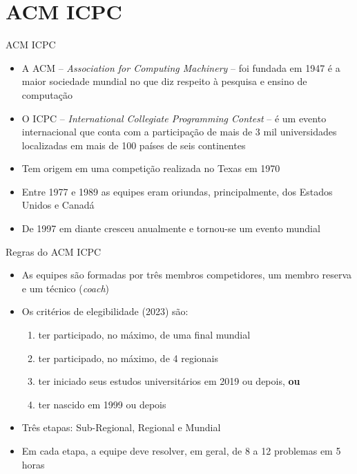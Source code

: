 \section{ACM ICPC}

\begin{frame}[fragile]{ACM ICPC}

    \begin{itemize}
        \item A ACM -- \textit{Association for Computing Machinery} -- foi fundada em 1947 é 
        a maior sociedade mundial no que diz respeito à pesquisa e ensino de computação
        \item O ICPC -- \textit{International Collegiate Programming Contest} -- é um evento
        internacional que conta com a participação de mais de 3 mil universidades localizadas em
        mais de 100 países de seis continentes
        \item Tem origem em uma competição realizada no Texas em 1970
        \item Entre 1977 e 1989 as equipes eram oriundas, principalmente, dos Estados Unidos e Canadá
        \item De 1997 em diante cresceu anualmente e tornou-se um evento mundial
    \end{itemize}

\end{frame}

\begin{frame}[fragile]{Regras do ACM ICPC}

    \begin{itemize}
        \item As equipes são formadas por três membros competidores, um membro reserva e um 
        técnico (\textit{coach})
        \item Os critérios de elegibilidade (2023) são:
            \begin{enumerate}
                \item ter participado, no máximo, de uma final mundial
                \item ter participado, no máximo, de 4 regionais
                \item ter iniciado seus estudos universitários em 2019 ou depois, \textbf{ou} 
                \item ter nascido em 1999 ou depois
            \end{enumerate}
        \item Três etapas: Sub-Regional, Regional e Mundial
        \item Em cada etapa, a equipe deve resolver, em geral, de 8 a 12 problemas em 5 horas
    \end{itemize}

\end{frame}

